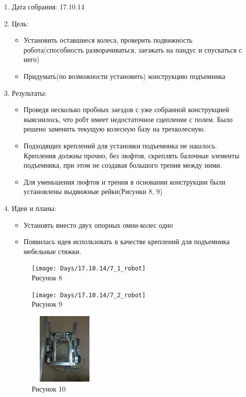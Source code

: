 
	\begin{enumerate}
	\item Дата собрания: 17.10.14
	\item Цель:
		\begin{itemize}
		\item Установить оставшиеся колеса, проверить подвижность робота(способность разворачиваться, заезжать на пандус и спускаться с него)
		\item Придумать(по возможности установить) конструкцию подъемника
		\end{itemize}
	\item Результаты:
		\begin{itemize}
		\item Проведя несколько пробных заездов с уже собранной конструкцией выяснилось, что робт имеет недостаточное сцепление с полем. Было решено заменить текущую колесную базу на трехколесную.
		\item Подходящих креплений для установки подъемника не нашлось. Крепления должны прочно, без люфтов, скреплять балочные элементы подъемника, при этом не создавая большого трения между ними.
		\item Для уменьшения люфтов и трения в основании конструкции были установлены выдвижные рейки(Рисунки 8, 9)
		\end{itemize}
	\item Идеи и планы:
		\begin{itemize}
		\item Установть вместо двух опорных омни-колес одно
		\item Появилась идея использовать в качестве креплений для подъемника мебельные стяжки.
		\end{itemize}
	\begin{figure} [h]
			\centering
			\begin{minipage}{0.3\linewidth}
				\texttt{[image: Days/17.10.14/7\_1\_robot]}\\ Рисунок 8
			\end{minipage}
			\begin{minipage}{0.3\linewidth}
				\texttt{[image: Days/17.10.14/7\_2\_robot]}\\ Рисунок 9
			\end{minipage}
			\begin{minipage}{0.3\linewidth}
				\includegraphics[width=35mm,height=35mm]{Days/17.10.14/7_3_robot}\\ Рисунок 10
			\end{minipage}		
	\end{figure}
	\end{enumerate}
\newpage